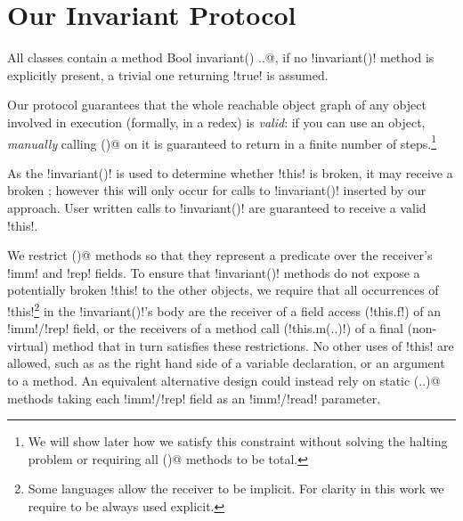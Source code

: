 \section{Our Invariant Protocol}
\label{s:protocol}
All classes contain a \Q@read method Bool invariant() {..}@, if no \Q!invariant()! method is explicitly present, a trivial one returning \Q!true! is assumed.

Our protocol guarantees that the whole reachable object graph of any object involved in execution (formally, in a redex) is \emph{valid}: if you can use an object, \emph{manually} calling \Q@invariant()@ on it is guaranteed to return \Q@true@ in a finite number of steps.\footnote{
  We will show later how we satisfy this constraint without 
  solving the halting problem or requiring all \Q@invariant()@ methods to be total.
  }

As the \Q!invariant()! is used to determine whether \Q!this! is broken, it may receive a broken \Q@this@; however this will only occur for calls to \Q!invariant()! inserted by our approach. User written calls to \Q!invariant()! are guaranteed to receive a valid \Q!this!.

We restrict \Q@invariant()@ methods so that they represent a predicate over the receiver's \Q!imm! and \Q!rep! fields. To ensure that \Q!invariant()! methods do not expose a potentially broken \Q!this! to the other objects, we require that all occurrences of \Q!this!\footnote{Some languages allow the \Q@this@ receiver to be implicit. For clarity in this work we require \Q@this@ to be always used explicit.}%
in the \Q!invariant()!'s body are the receiver of a field access (\Q!this.f!) of an \Q!imm!/\Q!rep! field, or the receivers of a method call (\Q!this.m(..)!) of a final (non-virtual) method that in turn satisfies these restrictions. No other uses of \Q!this! are allowed, such as as the right hand side of a variable declaration, or an argument to a method.
An equivalent alternative design could instead rely on static \Q@invariant(..)@ methods taking each \Q!imm!/\Q!rep! field as an \Q!imm!/\Q!read! parameter.

